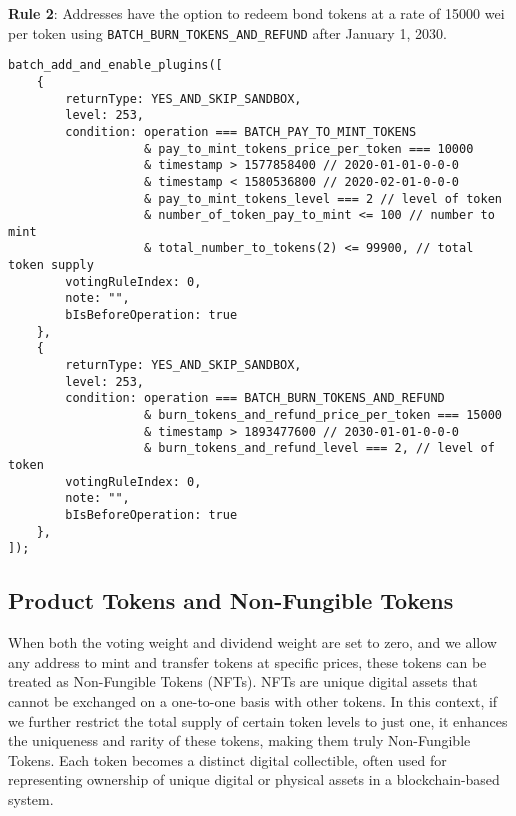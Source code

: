 \documentclass[main.tex]{subfiles}
\begin{document}
\textbf{Rule 2}: Addresses have the option to redeem bond tokens at a rate of 15000 wei per token using \texttt{BATCH\_BURN\_TOKENS\_AND\_REFUND} after January 1, 2030.

\begin{verbatim}
batch_add_and_enable_plugins([
    {
        returnType: YES_AND_SKIP_SANDBOX,
        level: 253, 
        condition: operation === BATCH_PAY_TO_MINT_TOKENS
                   & pay_to_mint_tokens_price_per_token === 10000
                   & timestamp > 1577858400 // 2020-01-01-0-0-0
                   & timestamp < 1580536800 // 2020-02-01-0-0-0
                   & pay_to_mint_tokens_level === 2 // level of token
                   & number_of_token_pay_to_mint <= 100 // number to mint
                   & total_number_to_tokens(2) <= 99900, // total token supply
        votingRuleIndex: 0, 
        note: "",
        bIsBeforeOperation: true  
    },
    {
        returnType: YES_AND_SKIP_SANDBOX,
        level: 253, 
        condition: operation === BATCH_BURN_TOKENS_AND_REFUND
                   & burn_tokens_and_refund_price_per_token === 15000
                   & timestamp > 1893477600 // 2030-01-01-0-0-0
                   & burn_tokens_and_refund_level === 2, // level of token
        votingRuleIndex: 0, 
        note: "",
        bIsBeforeOperation: true  
    },
]);
\end{verbatim}

\subsection{Product Tokens and Non-Fungible Tokens}

When both the voting weight and dividend weight are set to zero, and we allow any address to mint and transfer tokens at specific prices, these tokens can be treated as Non-Fungible Tokens (NFTs). NFTs are unique digital assets that cannot be exchanged on a one-to-one basis with other tokens. In this context, if we further restrict the total supply of certain token levels to just one, it enhances the uniqueness and rarity of these tokens, making them truly Non-Fungible Tokens. Each token becomes a distinct digital collectible, often used for representing ownership of unique digital or physical assets in a blockchain-based system.
\end{document}
